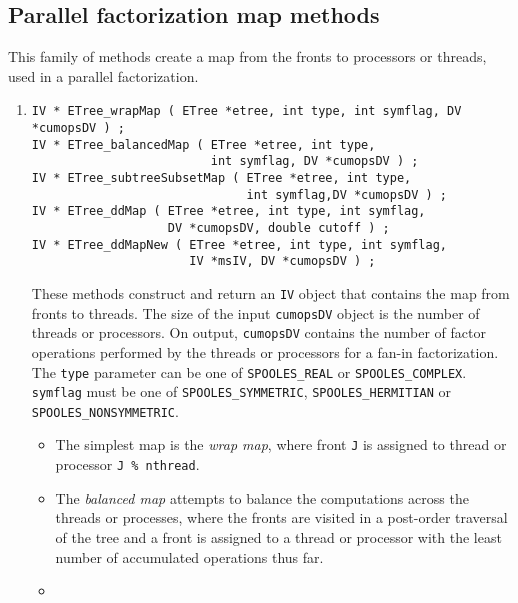 \par
\subsection{Parallel factorization map methods}
\label{subsection:ETree:proto:map}
This family of methods create a map from the fronts to processors
or threads, used in a parallel factorization.
\par
\begin{enumerate}
\item
\begin{verbatim}
IV * ETree_wrapMap ( ETree *etree, int type, int symflag, DV *cumopsDV ) ;
IV * ETree_balancedMap ( ETree *etree, int type, 
                         int symflag, DV *cumopsDV ) ;
IV * ETree_subtreeSubsetMap ( ETree *etree, int type, 
                              int symflag,DV *cumopsDV ) ;
IV * ETree_ddMap ( ETree *etree, int type, int symflag, 
                   DV *cumopsDV, double cutoff ) ;
IV * ETree_ddMapNew ( ETree *etree, int type, int symflag, 
                      IV *msIV, DV *cumopsDV ) ;
\end{verbatim}
These methods construct and return an {\tt IV} object that contains 
the map from fronts to threads.
The size of the input {\tt cumopsDV} object is the number of
threads or processors.
On output, {\tt cumopsDV} contains the number of factor operations
performed by the threads or processors for a fan-in factorization.
The {\tt type} parameter can be one of {\tt SPOOLES\_REAL} or
{\tt SPOOLES\_COMPLEX}.
{\tt symflag} must be one of {\tt SPOOLES\_SYMMETRIC},
{\tt SPOOLES\_HERMITIAN} or {\tt SPOOLES\_NONSYMMETRIC}.
\par
\begin{itemize}
\item
The simplest map is the {\it wrap map}, where front {\tt J} is
assigned to thread or processor {\tt J \% nthread}.
\item
The {\it balanced map} attempts to balance the computations across the
threads or processes, where the fronts are visited in a post-order
traversal of the tree and a front is assigned to a thread or
processor with the least number of accumulated operations thus far.
\item

\end{itemize}
\end{enumerate}
